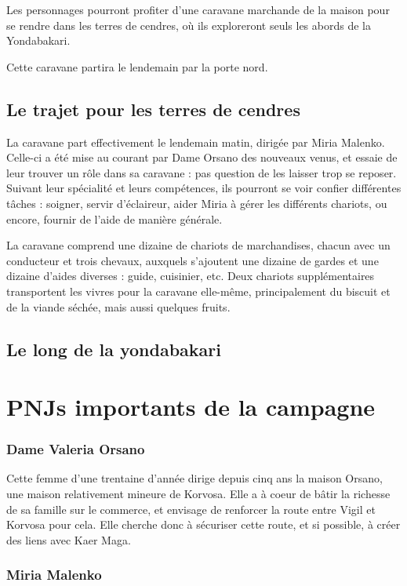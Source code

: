 \documentclass[letterpaper,10pt,twoside,twocolumn,openany]{book}
\begin{document}
Les personnages pourront profiter d'une caravane marchande de la maison pour se rendre dans les terres de cendres, où ils exploreront seuls les abords de la Yondabakari.

Cette caravane partira le lendemain par la porte nord.
\section{Le trajet pour les terres de cendres}
La caravane part effectivement le lendemain matin, dirigée par Miria Malenko. Celle-ci a été mise au courant par Dame Orsano des nouveaux venus, et essaie de leur trouver un rôle dans sa caravane : pas question de les laisser trop se reposer. Suivant leur spécialité et leurs compétences, ils pourront se voir confier différentes tâches : soigner, servir d'éclaireur, aider Miria à gérer les différents chariots, ou encore, fournir de l'aide de manière générale.

La caravane comprend une dizaine de chariots de marchandises, chacun avec un conducteur et trois chevaux, auxquels s'ajoutent une dizaine de gardes et une dizaine d'aides diverses : guide, cuisinier, etc. Deux chariots supplémentaires transportent les vivres pour la caravane elle-même, principalement du biscuit et de la viande séchée, mais aussi quelques fruits.


\section{Le long de la yondabakari}
\chapter{PNJs importants de la campagne}
\subsection{Dame Valeria Orsano}
Cette femme d'une trentaine d'année dirige depuis cinq ans la maison Orsano, une maison relativement mineure de Korvosa. Elle a à coeur de bâtir la richesse de sa famille sur le commerce, et envisage de renforcer la route entre Vigil et Korvosa pour cela. Elle cherche donc à sécuriser cette route, et si possible, à créer des liens avec Kaer Maga.
\subsection{Miria Malenko}
\end{document}
